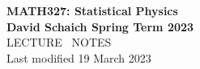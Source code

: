 \documentclass[12 pt]{article} %
\begin{document}
\thispagestyle{empty}
\begin{center}
  {\LARGE \textbf{MATH327: Statistical Physics}} \\[6 pt]
  \textbf{David Schaich \qquad\qquad\qquad\qquad Spring Term 2023} \\[48 pt]
  {\LARGE LECTURE \ NOTES} \\[6 pt]
  Last modified 19 March 2023
\end{center}
\renewcommand{\contentsname}{}
\setcounter{tocdepth}{1}
\tableofcontents



\newpage


\newpage


\newpage


\newpage


\newpage


\newpage


\newpage


\newpage


\newpage


\newpage


\newpage




\end{document}
